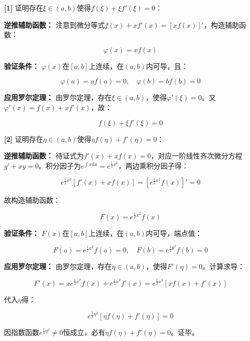 \documentclass[11pt,a4paper,UTF8]{ctexart}
\begin{document}
\begin{solbox}[分步推导与答题规范]
\textbf{[1]} 证明存在$\xi \in (a, b)$使得$f(\xi) + \xi f'(\xi) = 0$：

\textbf{逆推辅助函数：} 注意到微分等式$f(x) + xf'(x) = [x f(x)]'$，构造辅助函数：

 
\begin{equation*}
\varphi(x) = x f(x)
\end{equation*}


\textbf{验证条件：} $\varphi(x)$在$[a, b]$上连续，在$(a, b)$内可导，且：

 
\begin{equation*}
\varphi(a) = a f(a) = 0, \quad \varphi(b) = b f(b) = 0
\end{equation*}


\textbf{应用罗尔定理：} 由罗尔定理，存在$\xi \in (a, b)$，使得$\varphi'(\xi) = 0$。又$\varphi'(x) = f(x) + x f'(x)$，故：

 
\begin{equation*}
f(\xi) + \xi f'(\xi) = 0
\end{equation*}


\textbf{[2]} 证明存在$\eta \in (a, b)$使得$\eta f(\eta) + f'(\eta) = 0$：

\textbf{逆推辅助函数：} 待证式为$f'(x) + x f(x) = 0$，对应一阶线性齐次微分方程$y' + xy = 0$。积分因子为$e^{\int x \mathrm{d}x} = e^{\frac{1}{2}x^2}$，两边乘积分因子得：

 
\begin{equation*}
e^{\frac{1}{2}x^2}[f'(x) + x f(x)] = \left[e^{\frac{1}{2}x^2} f(x)\right]' = 0
\end{equation*}


 故构造辅助函数：

 
\begin{equation*}
F(x) = e^{\frac{1}{2}x^2} f(x)
\end{equation*}


\textbf{验证条件：} $F(x)$在$[a, b]$上连续，在$(a, b)$内可导，端点值：

 
\begin{equation*}
F(a) = e^{\frac{1}{2}a^2} f(a) = 0, \quad F(b) = e^{\frac{1}{2}b^2} f(b) = 0
\end{equation*}


\textbf{应用罗尔定理：} 由罗尔定理，存在$\eta \in (a, b)$，使得$F'(\eta) = 0$。计算求导：

 
\begin{equation*}
F'(x) = x e^{\frac{1}{2}x^2} f(x) + e^{\frac{1}{2}x^2} f'(x) = e^{\frac{1}{2}x^2}[x f(x) + f'(x)]
\end{equation*}


 代入$\eta$得：

 
\begin{equation*}
e^{\frac{1}{2}\eta^2}[\eta f(\eta) + f'(\eta)] = 0
\end{equation*}


 因指数函数$e^{\frac{1}{2}\eta^2} \neq 0$恒成立，必有$\eta f(\eta) + f'(\eta) = 0$。证毕。
\end{solbox}
\end{document}
